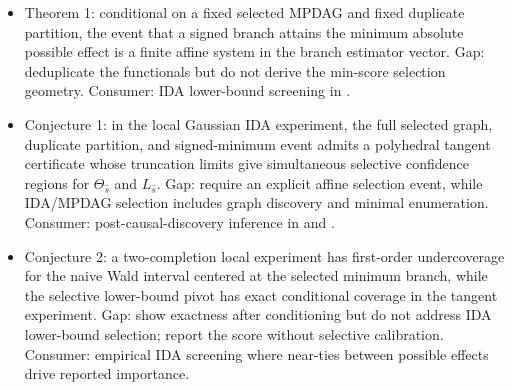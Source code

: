 \documentclass[11pt]{article}
\theoremstyle{definition}
\theoremstyle{plain}
\theoremstyle{remark}
\begin{document}
\begin{itemize}[leftmargin=*]
\item Theorem 1: conditional on a fixed selected MPDAG and fixed duplicate partition, the event that a signed branch attains the minimum absolute possible effect is a finite affine system in the branch estimator vector. Gap: \citet{GuoPerkovic2021MinimalEnumeration} deduplicate the functionals but do not derive the min-score selection geometry. Consumer: IDA lower-bound screening in \citet{MaathuisKalischBuhlmann2009IDA}.
\item Conjecture 1: in the local Gaussian IDA experiment, the full selected graph, duplicate partition, and signed-minimum event admits a polyhedral tangent certificate whose truncation limits give simultaneous selective confidence regions for $\Theta_{\widehat s}$ and $L_{\widehat s}$. Gap: \citet{LeeSunSunTaylor2016Polyhedral} require an explicit affine selection event, while IDA/MPDAG selection includes graph discovery and minimal enumeration. Consumer: post-causal-discovery inference in \citet{ChangGuoMalinsky2026PostSelectionCausalDiscovery} and \citet{GraduZrnicWangJordan2025ValidInference}.
\item Conjecture 2: a two-completion local experiment has first-order undercoverage for the naive Wald interval centered at the selected minimum branch, while the selective lower-bound pivot has exact conditional coverage in the tangent experiment. Gap: \citet{LeeSunSunTaylor2016Polyhedral} show exactness after conditioning but do not address IDA lower-bound selection; \citet{MaathuisKalischBuhlmann2009IDA} report the score without selective calibration. Consumer: empirical IDA screening where near-ties between possible effects drive reported importance.
\end{itemize}
\end{document}
